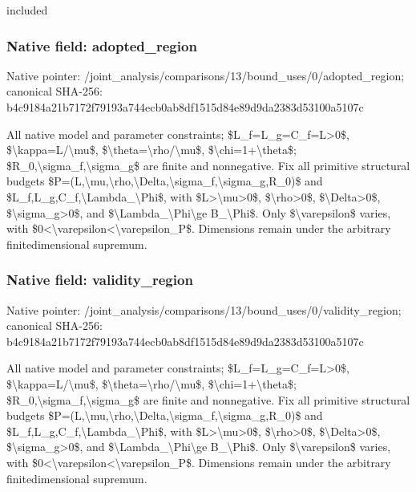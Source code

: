 \documentclass[10pt,a4paper]{article}
\begin{document}
included


\subsubsection{Native field: adopted\_region}


Native pointer: /joint\_analysis/comparis\allowbreak{}ons/13/bound\_uses/0/adop\allowbreak{}ted\_region; canonical SHA-256: b4c9184a21b7172f79193a74\allowbreak{}4ecb0ab8df1515d84e89d9da\allowbreak{}2383d53100a5107c


All native model and parameter constraints; \$L\_f=L\_g=C\_f=L>0\$, \$\textbackslash{}kappa=L/\textbackslash{}mu\$, \$\textbackslash{}theta=\textbackslash{}rho/\textbackslash{}mu\$, \$\textbackslash{}chi=1+\textbackslash{}theta\$; \$R\_0,\textbackslash{}sigma\_f,\textbackslash{}sigma\_g\$ are finite and nonnegative. Fix all primitive structural budgets \$P=(L,\textbackslash{}mu,\textbackslash{}rho,\textbackslash{}Delta,\textbackslash{}s\allowbreak{}igma\_f,\textbackslash{}sigma\_g,R\_0)\$ and \$L\_f,L\_g,C\_f,\textbackslash{}Lambda\_\textbackslash{}Phi\$, with \$L>\textbackslash{}mu>0\$, \$\textbackslash{}rho>0\$, \$\textbackslash{}Delta>0\$, \$\textbackslash{}sigma\_g>0\$, and \$\textbackslash{}Lambda\_\textbackslash{}Phi\textbackslash{}ge B\_\textbackslash{}Phi\$. Only \$\textbackslash{}varepsilon\$ varies, with \$0<\textbackslash{}varepsilon<\textbackslash{}varepsilon\_P\$. Dimensions remain under the arbitrary finitedimensional supremum.


\subsubsection{Native field: validity\_region}


Native pointer: /joint\_analysis/comparis\allowbreak{}ons/13/bound\_uses/0/vali\allowbreak{}dity\_region; canonical SHA-256: b4c9184a21b7172f79193a74\allowbreak{}4ecb0ab8df1515d84e89d9da\allowbreak{}2383d53100a5107c


All native model and parameter constraints; \$L\_f=L\_g=C\_f=L>0\$, \$\textbackslash{}kappa=L/\textbackslash{}mu\$, \$\textbackslash{}theta=\textbackslash{}rho/\textbackslash{}mu\$, \$\textbackslash{}chi=1+\textbackslash{}theta\$; \$R\_0,\textbackslash{}sigma\_f,\textbackslash{}sigma\_g\$ are finite and nonnegative. Fix all primitive structural budgets \$P=(L,\textbackslash{}mu,\textbackslash{}rho,\textbackslash{}Delta,\textbackslash{}s\allowbreak{}igma\_f,\textbackslash{}sigma\_g,R\_0)\$ and \$L\_f,L\_g,C\_f,\textbackslash{}Lambda\_\textbackslash{}Phi\$, with \$L>\textbackslash{}mu>0\$, \$\textbackslash{}rho>0\$, \$\textbackslash{}Delta>0\$, \$\textbackslash{}sigma\_g>0\$, and \$\textbackslash{}Lambda\_\textbackslash{}Phi\textbackslash{}ge B\_\textbackslash{}Phi\$. Only \$\textbackslash{}varepsilon\$ varies, with \$0<\textbackslash{}varepsilon<\textbackslash{}varepsilon\_P\$. Dimensions remain under the arbitrary finitedimensional supremum.
\end{document}
